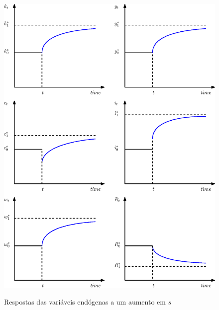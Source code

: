 \documentclass[11pt,a4paper]{article}
\begin{document}
\begin{figure}[!h]
\centering
\caption{Respostas das variáveis endógenas a um aumento em $s$} \vspace{2ex}
\includegraphics[scale=.72]{solow04.eps}
\label{fig:convergencia3}
\end{figure}
\end{document}

